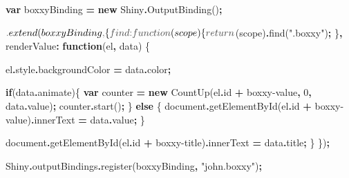 \documentclass[
]{krantz}
\makeatletter
\newenvironment{Shaded}{\begin{snugshade}}{\end{snugshade}}
\newcommand{\AttributeTok}[1]{\textcolor[rgb]{0.61,0.61,0.61}{#1}}
\newcommand{\BuiltInTok}[1]{#1}
\newcommand{\ControlFlowTok}[1]{\textcolor[rgb]{0.27,0.27,0.27}{\textbf{#1}}}
\newcommand{\DataTypeTok}[1]{\textcolor[rgb]{0.27,0.27,0.27}{#1}}
\newcommand{\DecValTok}[1]{\textcolor[rgb]{0.06,0.06,0.06}{#1}}
\newcommand{\FunctionTok}[1]{\textcolor[rgb]{0,0,0}{#1}}
\newcommand{\KeywordTok}[1]{\textcolor[rgb]{0.27,0.27,0.27}{\textbf{#1}}}
\newcommand{\NormalTok}[1]{#1}
\newcommand{\OperatorTok}[1]{\textcolor[rgb]{0.43,0.43,0.43}{\textbf{#1}}}
\newcommand{\StringTok}[1]{\textcolor[rgb]{0.5,0.5,0.5}{#1}}
\newenvironment{kframe}{%
\medskip{}
\setlength{\fboxsep}{.8em}
 \def\at@end@of@kframe{}%
 \ifinner\ifhmode%
  \def\at@end@of@kframe{\end{minipage}}%
  \begin{minipage}{\columnwidth}%
 \fi\fi%
 \def\FrameCommand##1{\hskip\@totalleftmargin \hskip-\fboxsep
 \colorbox{shadecolor}{##1}\hskip-\fboxsep
     \hskip-\linewidth \hskip-\@totalleftmargin \hskip\columnwidth}%
 \MakeFramed {\advance\hsize-\width
   \@totalleftmargin\z@ \linewidth\hsize
   \@setminipage}}%
 {\par\unskip\endMakeFramed%
 \at@end@of@kframe}
\renewenvironment{Shaded}{\begin{kframe}}{\end{kframe}}
\makeatother
\begin{document}
\begin{Shaded}
\begin{Highlighting}[]
\KeywordTok{var}\NormalTok{ boxxyBinding }\OperatorTok{=} \KeywordTok{new}\NormalTok{ Shiny}\OperatorTok{.}\FunctionTok{OutputBinding}\NormalTok{()}\OperatorTok{;}

\NormalTok{$}\OperatorTok{.}\FunctionTok{extend}\NormalTok{(boxxyBinding}\OperatorTok{,}\NormalTok{ \{}
  \DataTypeTok{find}\OperatorTok{:} \KeywordTok{function}\NormalTok{(scope) \{}
    \ControlFlowTok{return}\NormalTok{ $(scope)}\OperatorTok{.}\FunctionTok{find}\NormalTok{(}\StringTok{".boxxy"}\NormalTok{)}\OperatorTok{;}
\NormalTok{  \}}\OperatorTok{,}
  \DataTypeTok{renderValue}\OperatorTok{:} \KeywordTok{function}\NormalTok{(el}\OperatorTok{,}\NormalTok{ data) \{}

\NormalTok{    el}\OperatorTok{.}\AttributeTok{style}\OperatorTok{.}\AttributeTok{backgroundColor} \OperatorTok{=}\NormalTok{ data}\OperatorTok{.}\AttributeTok{color}\OperatorTok{;}

    \ControlFlowTok{if}\NormalTok{(data}\OperatorTok{.}\AttributeTok{animate}\NormalTok{)\{}
      \KeywordTok{var}\NormalTok{ counter }\OperatorTok{=} \KeywordTok{new}\NormalTok{ CountUp(el}\OperatorTok{.}\AttributeTok{id} \OperatorTok{+} \StringTok{\textquotesingle{}{-}boxxy{-}value\textquotesingle{}}\OperatorTok{,} \DecValTok{0}\OperatorTok{,}\NormalTok{ data}\OperatorTok{.}\AttributeTok{value}\NormalTok{)}\OperatorTok{;}
\NormalTok{      counter}\OperatorTok{.}\FunctionTok{start}\NormalTok{()}\OperatorTok{;}
\NormalTok{    \} }\ControlFlowTok{else}\NormalTok{ \{}
      \BuiltInTok{document}\OperatorTok{.}\FunctionTok{getElementById}\NormalTok{(el}\OperatorTok{.}\AttributeTok{id} \OperatorTok{+} \StringTok{\textquotesingle{}{-}boxxy{-}value\textquotesingle{}}\NormalTok{)}\OperatorTok{.}\AttributeTok{innerText} \OperatorTok{=}\NormalTok{ data}\OperatorTok{.}\AttributeTok{value}\OperatorTok{;}
\NormalTok{    \}}

    \BuiltInTok{document}\OperatorTok{.}\FunctionTok{getElementById}\NormalTok{(el}\OperatorTok{.}\AttributeTok{id} \OperatorTok{+} \StringTok{\textquotesingle{}{-}boxxy{-}title\textquotesingle{}}\NormalTok{)}\OperatorTok{.}\AttributeTok{innerText} \OperatorTok{=}\NormalTok{ data}\OperatorTok{.}\AttributeTok{title}\OperatorTok{;}
\NormalTok{  \}}
\NormalTok{\})}\OperatorTok{;}

\NormalTok{Shiny}\OperatorTok{.}\AttributeTok{outputBindings}\OperatorTok{.}\FunctionTok{register}\NormalTok{(boxxyBinding}\OperatorTok{,} \StringTok{"john.boxxy"}\NormalTok{)}\OperatorTok{;}
\end{Highlighting}
\end{Shaded}
\end{document}
